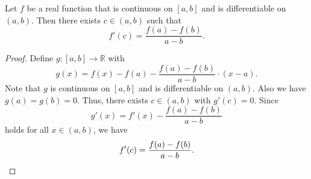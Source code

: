 \begin{theorem}
  Let $f$ be a real function that is continuous on $[a, b]$ and is
  differentiable on $(a, b)$.
  Then there exists $c \in (a, b)$ such that
  \begin{equation*}
    f'(c) = \frac{f(a) - f(b)}{a - b}.
  \end{equation*}
\end{theorem}
\begin{proof}
  Define $g: [a, b] \to \mathbb{R}$ with
  \begin{equation*}
    g(x) = f(x) - f(a) - \frac{f(a) - f(b)}{a - b} \cdot (x - a).
  \end{equation*}
  Note that $g$ is continuous on $[a, b]$ and is differentiable on $(a, b)$.
  Also we have $g(a) = g(b) = 0$.
  Thus, there exists $c \in (a, b)$ with $g'(c) = 0$.
  Since
  \begin{equation*}
    g'(x) = f'(x) - \frac{f(a) - f(b)}{a - b}
  \end{equation*}
  holds for all $x \in (a, b)$, we have
  \begin{equation*}
    f'(c) = \frac{f(a) - f(b)}{a - b}.
    \qedhere
  \end{equation*}
\end{proof}
